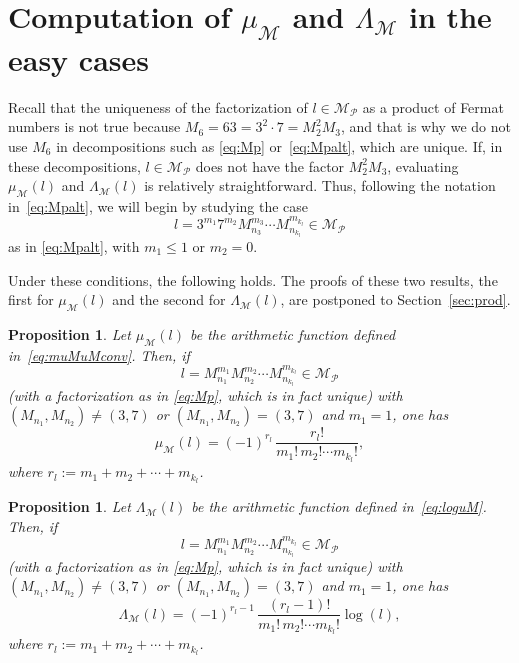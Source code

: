 \documentclass[11pt, a4paper]{article}
\newcommand{\calM}{\mathcal{M}}
\newcommand{\manM}{\Lambda_{\calM}}
\newcommand{\muM}{\mu_\calM}
\newcommand{\Mp}{\calM_{\mathcal{P}}}
\theoremstyle{plain}
\newtheorem{proposition}[theorem]{Proposition}
\theoremstyle{definition}
\begin{document}
\section{Computation of $\muM$ and $\manM$ in the easy cases}
\label{sec:easy}

Recall that the uniqueness of the factorization of $l \in \Mp$ as a product of Fermat numbers is not true because $M_6 = 63 = 3^2 \cdot 7 = M_2^2M_3$, and that is why we do not use $M_6$ in decompositions such as \eqref{eq:Mp} or~\eqref{eq:Mpalt}, which are unique.
If, in these decompositions, $l \in \Mp$ does not have the factor $M_2^2M_3$, evaluating $\muM(l)$ and $\manM(l)$ is relatively straightforward.
Thus, following the notation in~\eqref{eq:Mpalt}, we will begin by studying the case
\[
  l = 3^{m_1} 7^{m_2} M_{n_3}^{m_3} \cdots M_{n_{k_l}}^{m_{k_l}} \in \Mp
\] 
as in \eqref{eq:Mpalt}, with $m_1\le1$ or $m_2=0$. 

Under these conditions, the following holds. The proofs of these two results, the first for $\muM(l)$ and the second for $\manM(l)$, are postponed to Section~\ref{sec:prod}.

\begin{proposition}
\label{prop:mu(l)prod}
Let $\muM(l)$ be the arithmetic function defined in~\eqref{eq:muMuMconv}. 
Then, if 
\[
  l = M_{n_1}^{m_1} M_{n_2}^{m_2} \cdots M_{n_{k_l}}^{m_{k_l}} \in \Mp
\] 
(with a factorization as in \eqref{eq:Mp}, which is in fact unique) 
with $(M_{n_1},M_{n_2}) \ne (3,7)$ or $(M_{n_1},M_{n_2}) = (3,7)$ and $m_1=1$,
one has 
\begin{equation}
\label{eq:mu(l)prod}
  \muM(l) =
  (-1)^{r_l} \, \frac{r_l!}{m_1!\, m_2! \cdots m_{k_l}!}, 
\end{equation}
where $r_l := m_1 + m_2 + \cdots + m_{k_l}$.
\end{proposition}

\begin{proposition}
\label{prop:Man(l)prod}
Let $\manM(l)$ be the arithmetic function defined in~\eqref{eq:loguM}. 
Then, if 
\[
  l = M_{n_1}^{m_1} M_{n_2}^{m_2} \cdots M_{n_{k_l}}^{m_{k_l}} \in \Mp
\] 
(with a factorization as in \eqref{eq:Mp}, which is in fact unique) 
with $(M_{n_1},M_{n_2}) \ne (3,7)$ or $(M_{n_1},M_{n_2}) = (3,7)$ and $m_1=1$,
one has 
\begin{equation}
\label{eq:Man(l)prod}
  \manM(l) =
  (-1)^{r_l-1} \, \frac{(r_l-1)!}{m_1!\, m_2! \cdots m_{k_l}!} \log(l), 
\end{equation}
where $r_l := m_1 + m_2 + \cdots + m_{k_l}$.
\end{proposition}
\end{document}
